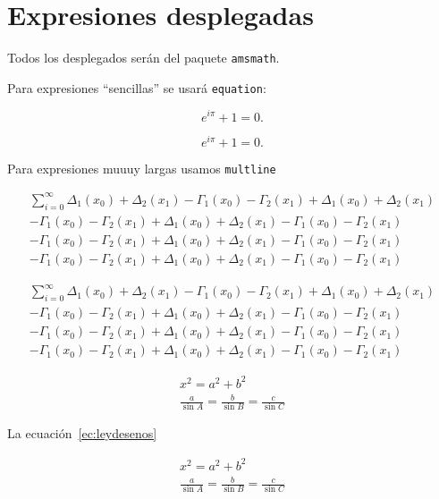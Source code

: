 \section{Expresiones desplegadas}
Todos los desplegados serán del paquete \texttt{amsmath}.

Para expresiones \enquote{sencillas} se usará \texttt{equation}:

\begin{equation}
  e^{i\pi} + 1 = 0.
\end{equation}

\begin{equation*}
  e^{i\pi} + 1 = 0.
\end{equation*}

Para expresiones muuuy largas usamos \texttt{multline}

\begin{multline*}
  \sum_{i=0}^{\infty} \Delta_1(x_0)+\Delta_2(x_1) - \Gamma_1(x_0)-\Gamma_2(x_1) +
  \Delta_1(x_0)+\Delta_2(x_1)\\[-5pt]
  - \Gamma_1(x_0)-\Gamma_2(x_1) +
  \Delta_1(x_0)+\Delta_2(x_1) - \Gamma_1(x_0)-\Gamma_2(x_1)\\[3pt]
  - \Gamma_1(x_0)-\Gamma_2(x_1) +
  \Delta_1(x_0)+\Delta_2(x_1) - \Gamma_1(x_0)-\Gamma_2(x_1)\\[3pt]
  - \Gamma_1(x_0)-\Gamma_2(x_1) +
  \Delta_1(x_0)+\Delta_2(x_1) - \Gamma_1(x_0)-\Gamma_2(x_1)
\end{multline*}

\begin{multline*}
  \sum_{i=0}^{\infty} \Delta_1(x_0)+\Delta_2(x_1) - \Gamma_1(x_0)-\Gamma_2(x_1) +
  \Delta_1(x_0)+\Delta_2(x_1)\\
  - \Gamma_1(x_0)-\Gamma_2(x_1) +
  \Delta_1(x_0)+\Delta_2(x_1) - \Gamma_1(x_0)-\Gamma_2(x_1)\\
  - \Gamma_1(x_0)-\Gamma_2(x_1) +
  \Delta_1(x_0)+\Delta_2(x_1) - \Gamma_1(x_0)-\Gamma_2(x_1)\\
  - \Gamma_1(x_0)-\Gamma_2(x_1) +
  \Delta_1(x_0)+\Delta_2(x_1) - \Gamma_1(x_0)-\Gamma_2(x_1)
\end{multline*}

\begin{gather}
  x^2 = a^2 + b^2 \\
  \frac{a}{\sin A} =\frac{b}{\sin B} = \frac{c}{\sin C} \label{ec:leydesenos}
\end{gather}

La ecuación~\ref{ec:leydesenos}

\begin{equation}
\begin{gathered}
  x^2 = a^2 + b^2 \\
  \frac{a}{\sin A} =\frac{b}{\sin B} = \frac{c}{\sin C} 
\end{gathered}
\end{equation}

